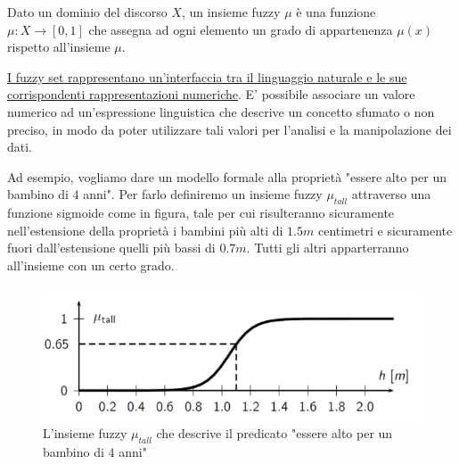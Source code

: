\begin{definizione}
Dato un dominio del discorso $X$, un insieme fuzzy $\mu$ è una funzione $\mu : X \to [0,1]$ che assegna ad ogni elemento un grado di appartenenza $\mu(x)$ rispetto all'insieme $\mu$.
\end{definizione}

\uline{I fuzzy set rappresentano un'interfaccia tra il linguaggio naturale e le sue corrispondenti rappresentazioni numeriche}. E' possibile associare un valore numerico ad un'espressione linguistica che descrive un concetto sfumato o non preciso, in modo da poter utilizzare tali valori per l'analisi e la manipolazione dei dati.

Ad esempio, vogliamo dare un modello formale alla proprietà "essere alto per un bambino di $4$ anni". Per farlo definiremo un insieme fuzzy $\mu_{tall}$ attraverso una funzione sigmoide come in figura, tale per cui risulteranno sicuramente nell’estensione della proprietà i bambini più alti di $1.5m$ centimetri e sicuramente fuori dall’estensione quelli più bassi di $0.7m$. Tutti gli altri apparterranno all’insieme con un certo grado.

\begin{figure}[h]
    \centering
    \includegraphics[scale=0.4]{images/utall.png}
    \caption{L’insieme fuzzy $\mu_{tall}$ che descrive il predicato "essere alto per un bambino di $4$ anni"}
\end{figure}

